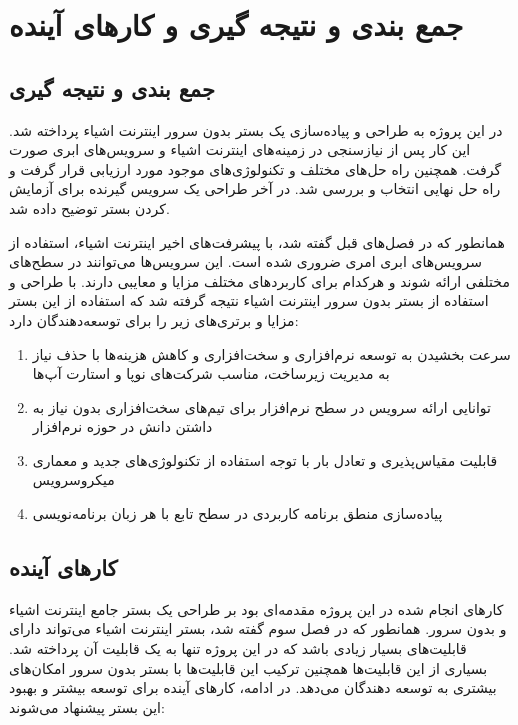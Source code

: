 \chapter{جمع بندی و نتیجه گیری و  کارهای آینده}\label{chapter4}

\section{جمع بندی و نتیجه گیری}

در این پروژه به طراحی و پیاده‌سازی یک بستر بدون سرور اینترنت اشیاء پرداخته شد. این کار پس از نیازسنجی در زمینه‌های اینترنت اشیاء و سرویس‌های ابری صورت گرفت. همچنین راه حل‌های مختلف و تکنولوژی‌های موجود مورد ارزیابی قرار گرفت و راه حل نهایی انتخاب و بررسی شد. در آخر طراحی یک سرویس گیرنده برای آزمایش کردن بستر توضیح داده شد.

همانطور که در فصل‌های قبل گفته شد، با پیشرفت‌های اخیر اینترنت اشیاء، استفاده از سرویس‌های ابری امری ضروری شده است. این سرویس‌ها می‌توانند در سطح‌های مختلفی ارائه شوند و هرکدام برای کاربردهای مختلف مزایا و معایبی دارند. با طراحی و استفاده از بستر بدون سرور اینترنت اشیاء نتیجه گرفته شد که استفاده از این بستر مزایا و برتری‌های زیر را برای توسعه‌دهندگان دارد: 

\begin{enumerate}
	
	\item سرعت بخشیدن به توسعه نرم‌افزاری و سخت‌افزاری و کاهش هزینه‌ها با حذف نیاز به مدیریت زیرساخت، مناسب شرکت‌های نوپا و استارت آپ‌ها
	
	\item توانایی ارائه‌ سرویس در سطح نرم‌افزار برای تیم‌های سخت‌افزاری بدون نیاز به داشتن دانش در حوزه نرم‌افزار
	
	\item قابلیت مقیاس‌پذیری و تعادل بار با توجه استفاده از تکنولوژی‌های جدید و معماری میکروسرویس
	
	\item پیاده‌سازی منطق برنامه کاربردی در سطح تابع با هر زبان برنامه‌نویسی
	
\end{enumerate}

\newpage

\section{کارهای آینده}

کارهای انجام شده در این پروژه مقدمه‌ای بود بر طراحی یک بستر جامع اینترنت اشیاء و بدون سرور. همانطور که در فصل سوم گفته شد، بستر اینترنت اشیاء می‌تواند دارای قابلیت‌های بسیار زیادی باشد که در این پروژه تنها به یک قابلیت آن پرداخته شد. بسیاری از این قابلیت‌ها  همچنین ترکیب این قابلیت‌ها با بستر بدون سرور امکان‌های بیشتری به توسعه دهندگان می‌دهد. در ادامه، کارهای آینده برای توسعه بیشتر و بهبود این بستر پیشنهاد می‌شوند:

